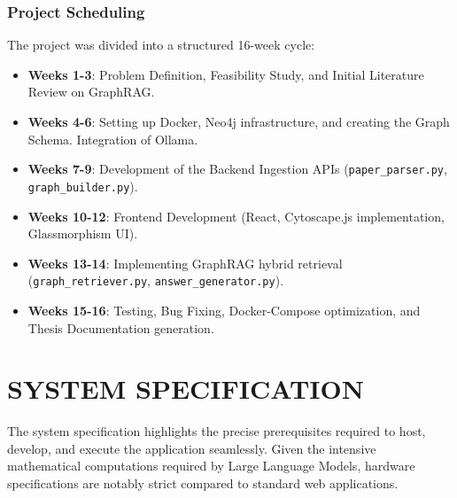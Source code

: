 \documentclass[12pt,a4paper]{report}
\begin{document}
\subsection{Project Scheduling}
The project was divided into a structured 16-week cycle:
\begin{itemize}
    \item \textbf{Weeks 1-3}: Problem Definition, Feasibility Study, and Initial Literature Review on GraphRAG.
    \item \textbf{Weeks 4-6}: Setting up Docker, Neo4j infrastructure, and creating the Graph Schema. Integration of Ollama.
    \item \textbf{Weeks 7-9}: Development of the Backend Ingestion APIs (\texttt{paper\_parser.py}, \texttt{graph\_builder.py}).
    \item \textbf{Weeks 10-12}: Frontend Development (React, Cytoscape.js implementation, Glassmorphism UI).
    \item \textbf{Weeks 13-14}: Implementing GraphRAG hybrid retrieval (\texttt{graph\_retriever.py}, \texttt{answer\_generator.py}).
    \item \textbf{Weeks 15-16}: Testing, Bug Fixing, Docker-Compose optimization, and Thesis Documentation generation.
\end{itemize}

\chapter{SYSTEM SPECIFICATION}
\noindent{\rule{\textwidth}{1.5pt}}

The system specification highlights the precise prerequisites required to host, develop, and execute the application seamlessly. Given the intensive mathematical computations required by Large Language Models, hardware specifications are notably strict compared to standard web applications.
\end{document}
